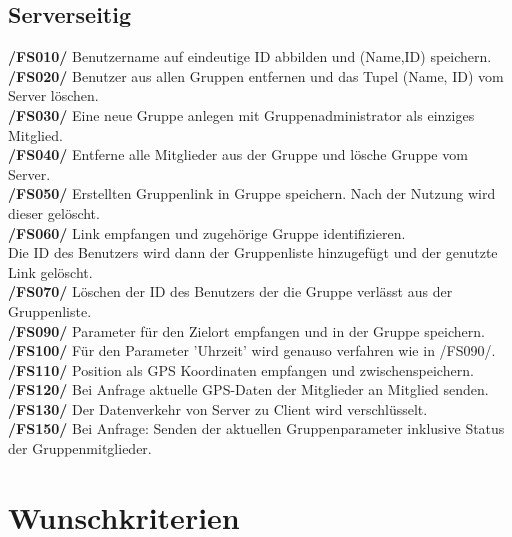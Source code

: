 \subsection{Serverseitig}
     \textbf{/FS010/} Benutzername auf eindeutige ID abbilden und (Name,ID) speichern.\\
     \textbf{/FS020/} Benutzer aus allen Gruppen entfernen und das Tupel (Name, ID) vom Server löschen.\\
     \textbf{/FS030/} Eine neue Gruppe anlegen mit Gruppenadministrator als einziges Mitglied.\\
     \textbf{/FS040/} Entferne alle Mitglieder aus der Gruppe und lösche Gruppe vom Server.\\
     \textbf{/FS050/} Erstellten Gruppenlink in Gruppe speichern. Nach der Nutzung wird dieser gelöscht.\\
     \textbf{/FS060/} Link empfangen und zugehörige Gruppe identifizieren.\\ Die ID des Benutzers wird dann der Gruppenliste hinzugefügt und der genutzte Link gelöscht.\\
     \textbf{/FS070/} Löschen der ID des Benutzers der die Gruppe verlässt aus der Gruppenliste.\\
     \textbf{/FS090/} Parameter für den Zielort empfangen und in der Gruppe speichern.\\
     \textbf{/FS100/} Für den Parameter 'Uhrzeit' wird genauso verfahren wie in /FS090/. \\
     \textbf{/FS110/} Position als GPS Koordinaten empfangen und zwischenspeichern.\\
     \textbf{/FS120/} Bei Anfrage aktuelle GPS-Daten der Mitglieder an Mitglied senden.\\
     \textbf{/FS130/} Der Datenverkehr von Server zu Client wird verschlüsselt.\\
     \textbf{/FS150/} Bei Anfrage: Senden der aktuellen Gruppenparameter inklusive Status der Gruppenmitglieder.\\
\section{Wunschkriterien}
